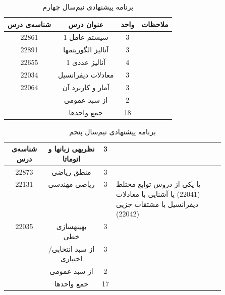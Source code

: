 \documentclass{article}
\begin{document}
\begin{table}[H]
\begin{center}
	\begin{tabular}{|c|c|c|c|}
		\hline
		شناسه‌ی درس & عنوان درس & واحد & ملاحظات \\
		\hline
		22861 & سیستم عامل 1 & 3 &  \\
		\hline
		22891 & آنالیز الگوریتمها & 3 &  \\
		\hline
		22655 & آنالیز عددی 1 & 4 &  \\
		\hline
		22034 & معادلات دیفرانسیل & 3 &  \\
		\hline
		22064 & آمار و کاربرد آن & 3 &  \\
		\hline
		& از سبد عمومی & 2 &  \\
		\hline
		& جمع واحدها & 18 &  \\
		\hline
	\end{tabular}
\caption{\label{cs-t9}
برنامه پیشنهادی نیم‌سال چهارم
}
\end{center}
		\end{table}

		\begin{table}[H]
\begin{center}
\begin{tabular}{|c|c|c|p{0.5\linewidth}|}
	\hline
	شناسه‌ی درس & نظریهی زبانها و اتوماتا & 3 &  \\
	\hline
	22873 & منطق ریاضی & 3 &  \\
	\hline
	22131 & ریاضی مهندسی & 3 & یا یکی از دروس توابع مختلط (22041) یا آشنایی با معادلات دیفرانسیل با مشتقات جزیی (22042) \\
	\hline
	22035 & بهینهسازی خطی & 3 &  \\
	\hline
	& از سبد انتخابی/اختیاری & 3 &  \\
	\hline
	& از سبد عمومی & 2 &  \\
	\hline
	& جمع واحدها & 17 &  \\
	\hline
\end{tabular}
\caption{\label{cs-t10}
برنامه پیشنهادی نیم‌سال پنجم
}
\end{center}
\end{table}
\end{document}

